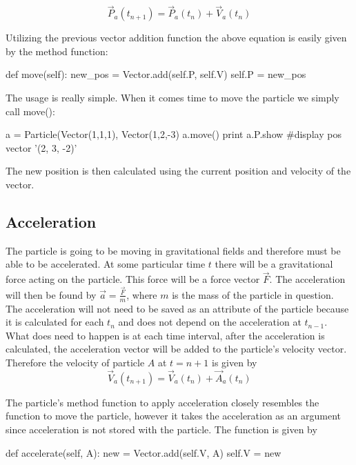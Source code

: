 \documentclass[15pt]{report}
\begin{document}
\begin{equation}
 \vec{P}_a (t_{n+1}) = \vec{P}_{a}(t_n) + \vec{V}_a (t_n)
\end{equation}

Utilizing the previous vector addition function the above equation is easily given by the method function:

\begin{code}
def move(self):
    new_pos = Vector.add(self.P, self.V)
    self.P = new_pos
\end{code}

The usage is really simple. When it comes time to move the particle we simply call move(): 

\begin{code}
a = Particle(Vector(1,1,1), Vector(1,2,-3)
a.move()
print a.P.show		#display pos vector
'(2, 3, -2)'   
\end{code}

The new position is then calculated using the current position and velocity of the vector.

\subsection{Acceleration} The particle is going to be moving in gravitational fields and therefore must be able to be accelerated. At some particular time $t$ there will be a gravitational force acting on the particle. This force will be a force vector $\vec{F}$. The acceleration will then be found by $\vec{a} = \frac{\vec{F}}{m}$, where $m$ is the mass of the particle in question. The acceleration will not need to be saved as an attribute of the particle because it is calculated for each $t_n$ and does not depend on the acceleration at $t_{n-1}$. What does need to happen is at each time interval, after the acceleration is calculated, the acceleration vector will be added to the particle's velocity vector. Therefore the velocity of particle $A$ at $t = {n + 1}$ is given by 
\begin{equation}
\vec{V}_a (t_{n+1}) = \vec{V}_a (t_n) + \vec{A}_a (t_n)
\end{equation}

The particle's method function to apply acceleration closely resembles the function to move the particle, however it takes the acceleration as an argument since acceleration is not stored with the particle.  The function is given by

\begin{code}
def accelerate(self, A):
    new = Vector.add(self.V, A)
    self.V = new
\end{code}
\end{document}
